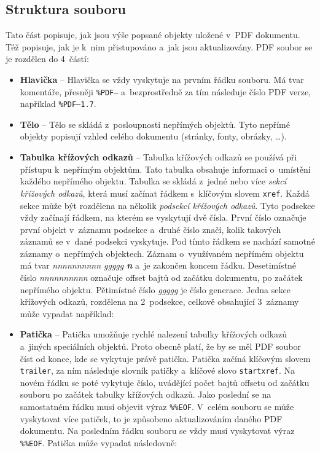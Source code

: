 \subsection*{Struktura souboru}
Tato část popisuje, jak jsou výše popsané objekty uložené v~PDF dokumentu.
Též popisuje, jak je k~nim přistupováno a~jak jsou aktualizovány.
PDF soubor se je rozdělen do 4~částí: 
\begin{itemize}
    \item \textbf{Hlavička} -- Hlavička se vždy vyskytuje na prvním řádku souboru.
    Má tvar komentáře, přesněji \texttt{\%PDF–} a~bezprostředně za tím následuje
    číslo PDF verze, například \texttt{\%PDF–1.7}.
    
    \item \textbf{Tělo} -- Tělo se skládá z~posloupnosti nepřímých objektů. Tyto 
    nepřímé objekty popisují vzhled celého dokumentu (stránky, fonty, obrázky,
    \ldots).
    
    \item \textbf{Tabulka křížových odkazů} -- Tabulka křížových odkazů se používá
    při přístupu k~nepřímým objektům. Tato tabulka obsahuje informaci o~umístění
    každého nepřímého objektu. Tabulka se skládá z~jedné nebo více \emph{sekcí
    křížových odkazů}, která musí začínat řádkem s~klíčovým slovem \texttt{xref}.
    Každá sekce může být rozdělena na několik \emph{podsekcí křížových odkazů}.
    Tyto podsekce vždy začínají řádkem, na kterém se vyskytují dvě čísla. První
    číslo označuje první objekt v~záznamu podsekce a~druhé číslo značí, kolik
    takových záznamů se v~dané podsekci vyskytuje. Pod tímto řádkem se nachází
    samotné záznamy o~nepřímých objektech. Záznam o~využívaném nepřímém objektu
    má tvar \emph{nnnnnnnnnn ggggg \textbf{n}} a~je zakončen koncem řádku.
    Desetimístné číslo \emph{nnnnnnnnnn} označuje offset bajtů od začátku
    dokumentu, po začátek nepřímého objektu. Pětimístné číslo \emph{ggggg} je
    číslo generace. Jedna sekce křížových odkazů, rozdělena na 2~podsekce, celkově
    obsahující 3~záznamy může vypadat například:
    
    \item \textbf{Patička} -- Patička umožňuje rychlé nalezení tabulky křížových
    odkazů a~jiných speciálních objektů. Proto obecně platí, že by se měl PDF
    soubor číst od konce, kde se vykytuje právě patička. Patička začíná klíčovým
    slovem \texttt{trailer}, za ním následuje slovník patičky a~klíčové slovo
    \texttt{startxref}. Na novém řádku se poté vykytuje číslo, uvádějící počet
    bajtů offsetu od začátku souboru po začátek tabulky křížových odkazů. Jako
    poslední se na samostatném řádku musí objevit výraz \texttt{\%\%EOF}.
    V~celém souboru se může vyskytovat více patiček, to je způsobeno aktualizováním
    daného PDF dokumentu. Na posledním řádku souboru se vždy musí vyskytovat
    výraz \texttt{\%\%EOF}. Patička může vypadat následovně:

\end{itemize}


